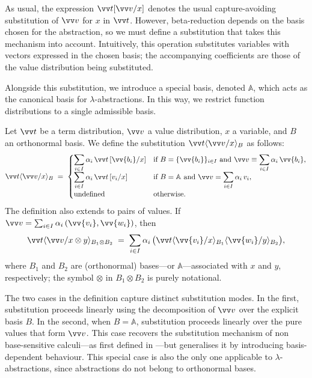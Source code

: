 \documentclass[runningheads,orivec,envcountsame,envcountsect]{llncs}
\newcommand\ansubst[2]{\ensuremath{\langle #1 \rangle_{#2}}}
\newcommand\AbsBasis{\ensuremath{\mathbb{A}}}
\def\Pair#1#2{(#1,#2)} %
\def\ds{\displaystyle}
\begin{document}
As usual, the expression $\vv t[\vv v/x]$ denotes the
usual capture-avoiding substitution of $\vv v$ for $x$ in $\vv t$.
However, beta-reduction depends on the basis chosen for the abstraction, so we must
define a substitution that takes this mechanism into account. Intuitively, this
operation substitutes variables with vectors expressed in the chosen basis; the
accompanying coefficients are those of the value distribution being
substituted.

Alongside this substitution, we introduce a special basis, denoted
$\AbsBasis$, which acts as the canonical basis for $\lambda$-abstractions. In
this way, we restrict function distributions to a single admissible basis.


\begin{definition}
  Let $\vv t$ be a term distribution, $\vv v$ a value distribution, $x$ a
  variable, and $B$ an orthonormal basis. We define the substitution
  $\vv t\ansubst{\vv v/x}{B}$ as follows:
  \[
    \vv t\ansubst{\vv v/x}{B} \;=\;
    \begin{cases}
      \ds\sum_{i\in I}\alpha_i\,\vv t\,[\vv{b_i}/x] &
        \text{if } B=\{\vv{b_i}\}_{i\in I}\ \text{and}\
        \vv v \equiv \ds\sum_{i\in I}\alpha_i\,\vv{b_i},\\[6pt]
      \ds\sum_{i\in I}\alpha_i\,\vv t\,[v_i/x] &
        \text{if } B=\AbsBasis\ \text{and}\
        \vv v = \ds\sum_{i\in I}\alpha_i\,v_i,\\[2pt]
      \text{undefined} & \text{otherwise.}
    \end{cases}
  \]
  The definition also extends to pairs of values. If
  $\vv v=\sum_{i\in I}\alpha_i\,\Pair{\vv{v_i}}{\vv{w_i}}$, then
  \[
    \vv t\ansubst{\vv v/x\otimes y}{B_1\otimes B_2}
      \;=\; \sum_{i\in I}\alpha_i\,
      \bigl(\vv t\ansubst{\vv{v_i}/x}{B_1}\ansubst{\vv{w_i}/y}{B_2}\bigr),
  \]
  where $B_1$ and $B_2$ are (orthonormal) bases---or $\AbsBasis$---associated
  with $x$ and $y$, respectively; the symbol $\otimes$ in $B_1\otimes B_2$ is
  purely notational.
\end{definition}

The two cases in the definition capture distinct substitution modes.  
In the first, substitution proceeds linearly using the decomposition of
$\vv v$ over the explicit basis $B$.  
In the second, when $B=\AbsBasis$, substitution proceeds linearly over the pure
values that form $\vv v$.  
This case recovers the substitution mechanism of 
non base-sensitive calculi---as first defined in
\cite{ArrighiDowekLMCS17}---but generalises it by introducing
basis-dependent behaviour.  
This special case is also the only one applicable to
$\lambda$-abstractions, since abstractions do not belong to orthonormal bases.
\end{document}
